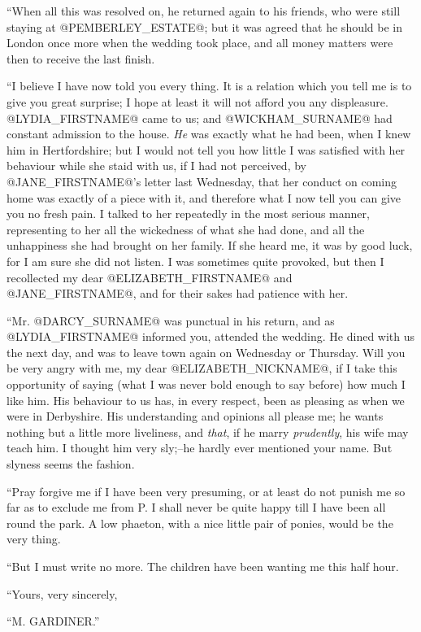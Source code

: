 ``When all this was resolved on, he returned again to his friends, who
were still staying at @PEMBERLEY_ESTATE@; but it was agreed that he should be in
London once more when the wedding took place, and all money matters were
then to receive the last finish.

``I believe I have now told you every thing. It is a relation which
you tell me is to give you great surprise; I hope at least it will not
afford you any displeasure. @LYDIA_FIRSTNAME@ came to us; and @WICKHAM_SURNAME@ had constant
admission to the house. \textit{He} was exactly what he had been, when I
knew him in Hertfordshire; but I would not tell you how little I was
satisfied with her behaviour while she staid with us, if I had not
perceived, by @JANE_FIRSTNAME@'s letter last Wednesday, that her conduct on coming
home was exactly of a piece with it, and therefore what I now tell
you can give you no fresh pain. I talked to her repeatedly in the most
serious manner, representing to her all the wickedness of what she had
done, and all the unhappiness she had brought on her family. If she
heard me, it was by good luck, for I am sure she did not listen. I was
sometimes quite provoked, but then I recollected my dear @ELIZABETH_FIRSTNAME@ and
@JANE_FIRSTNAME@, and for their sakes had patience with her.

``Mr. @DARCY_SURNAME@ was punctual in his return, and as @LYDIA_FIRSTNAME@ informed you,
attended the wedding. He dined with us the next day, and was to leave
town again on Wednesday or Thursday. Will you be very angry with me, my
dear @ELIZABETH_NICKNAME@, if I take this opportunity of saying (what I was never bold
enough to say before) how much I like him. His behaviour to us has,
in every respect, been as pleasing as when we were in Derbyshire. His
understanding and opinions all please me; he wants nothing but a little
more liveliness, and \textit{that}, if he marry \textit{prudently}, his wife may teach
him. I thought him very sly;--he hardly ever mentioned your name. But
slyness seems the fashion.

``Pray forgive me if I have been very presuming, or at least do not
punish me so far as to exclude me from P. I shall never be quite happy
till I have been all round the park. A low phaeton, with a nice little
pair of ponies, would be the very thing.

``But I must write no more. The children have been wanting me this half
hour.

``Yours, very sincerely,

``M. GARDINER.''

